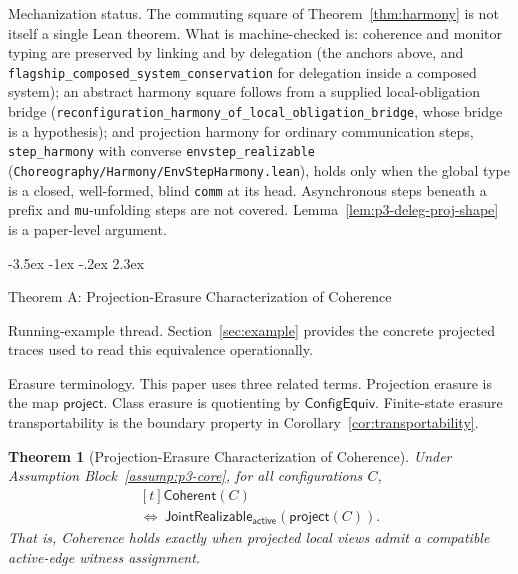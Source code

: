 \documentclass[a4paper,10pt,twocolumn,english]{article}
\makeatletter
\renewcommand{\section}{\@startsection{section}{1}{\z@}%
  {-3.5ex \@plus -1ex \@minus -.2ex}%
  {2.3ex}%
  {\raggedright\normalfont\large\bfseries}}
\numberwithin{equation}{section}
\theoremstyle{paperdef}
\theoremstyle{paperplain}
\newtheorem{theorem}[definition]{Theorem}
\theoremstyle{paperdef}
\theoremstyle{paperremark}
\theoremstyle{paperdef}
\newcommand{\Coherent}{\ensuremath{\mathsf{Coherent}}}
\newcommand{\ConfigEquiv}{\ensuremath{\mathsf{ConfigEquiv}}}
\newcommand{\JointActive}[1]{\ensuremath{\mathsf{JointRealizable}_{\mathsf{active}}(#1)}}
\makeatother
\begin{document}
Mechanization status. The commuting square of Theorem~\ref{thm:harmony} is not
itself a single Lean theorem. What is machine-checked is: coherence and monitor
typing are preserved by linking and by delegation (the anchors above, and
\nolinkurl{flagship_composed_system_conservation} for delegation inside a
composed system); an abstract harmony square follows from a supplied
local-obligation bridge
(\nolinkurl{reconfiguration_harmony_of_local_obligation_bridge}, whose bridge is a
hypothesis); and projection harmony for ordinary communication steps,
\nolinkurl{step_harmony} with converse \nolinkurl{envstep_realizable}
(\texttt{Choreography/\allowbreak Harmony/\allowbreak EnvStepHarmony.lean}), holds only when the
global type is a closed, well-formed, blind \texttt{comm} at its head.
Asynchronous steps beneath a prefix and \texttt{mu}-unfolding steps are not
covered. Lemma~\ref{lem:p3-deleg-proj-shape} is a paper-level argument.

\section{Theorem A: Projection-Erasure Characterization of Coherence}
\label{sec:theorem-a}

Running-example thread. Section~\ref{sec:example} provides the concrete
projected traces used to read this equivalence operationally.

Erasure terminology. This paper uses three related terms. Projection erasure is
the map $\mathsf{project}$. Class erasure is quotienting by \ConfigEquiv.
Finite-state erasure transportability is the boundary property in
Corollary~\ref{cor:transportability}.

\begin{theorem}[Projection-Erasure Characterization of Coherence]
	\label{thm:erasure}
	Under Assumption Block~\ref{assump:p3-core}, for all configurations $C$,
	\begin{equation}
		\begin{aligned}[t]
			\Coherent(C)
			\\
			\iff\ \JointActive{\mathsf{project}(C)}.
		\end{aligned}
	\end{equation}
	That is, Coherence holds exactly when projected local views admit a compatible active-edge witness assignment.
\end{theorem}
\end{document}
